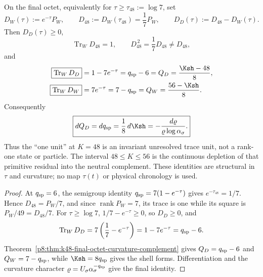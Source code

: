 \documentclass[12pt,a4paper]{article}
\begin{document}
\begin{corollary}
\label{p8:cor:final-octet-primitive-remnant-depletion}
On the final octet, equivalently for \(\tau\geq\tau_{48}:=\log7\), set
\begin{equation}
 \label{p8:eq:final-octet-remnant-operators}
 D_W(\tau):=e^{-\tau}P_W,
 \qquad
 D_{48}:=D_W(\tau_{48})=\frac17P_W,
 \qquad
 D_D(\tau):=D_{48}-D_W(\tau).
\end{equation}
Then \(D_D(\tau)\geq0\),
\begin{equation}
 \label{p8:eq:k48-unit-trace-nonprojector}
 \boxed{\operatorname{Tr}_W D_{48}=1},
 \qquad
 \boxed{D_{48}^{\,2}=\frac17D_{48}\neq D_{48}},
\end{equation}
and
\begin{align}
 \label{p8:eq:final-octet-remnant-trace-identities}
 \boxed{\operatorname{Tr}_W D_D}
 &=1-7e^{-\tau}
 =q_{\rm sp}-6
 =Q_D
 =\frac{\Ksh-48}{8},\\
 \boxed{\operatorname{Tr}_W D_W}
 &=7e^{-\tau}
 =7-q_{\rm sp}
 =Q_W
 =\frac{56-\Ksh}{8}.
\end{align}
Consequently
\begin{equation}
 \label{p8:eq:final-octet-transfer-exact-differential}
 \boxed{
 dQ_D=dq_{\rm sp}=\frac18\,d\Ksh
 =-\frac{d\varrho}{\varrho\log\alpha_\sigma}.}
\end{equation}
Thus the ``one unit'' at \(K=48\) is an invariant unresolved trace unit,
not a rank-one state or particle.  The interval \(48\leq K\leq56\) is the
continuous depletion of that primitive residual into the neutral complement.
These identities are structural in \(\tau\) and curvature; no map \(\tau(t)\)
or physical chronology is used.
\end{corollary}

\begin{proof}
At \(q_{\rm sp}=6\), the semigroup identity
\(q_{\rm sp}=7(1-e^{-\tau})\) gives \(e^{-\tau_{48}}=1/7\).  Hence
\(D_{48}=P_W/7\), and since \(\operatorname{rank}P_W=7\), its trace is one
while its square is \(P_W/49=D_{48}/7\).  For \(\tau\geq\log7\),
\(1/7-e^{-\tau}\geq0\), so \(D_D\geq0\), and
\[
 \operatorname{Tr}_W D_D
 =7\left(\frac17-e^{-\tau}\right)
 =1-7e^{-\tau}=q_{\rm sp}-6.
\]
Theorem~\ref{p8:thm:k48-final-octet-curvature-complement} gives
\(Q_D=q_{\rm sp}-6\) and \(Q_W=7-q_{\rm sp}\), while
\(\Ksh=8q_{\rm sp}\) gives the shell forms.  Differentiation and the
curvature character
\(\varrho=U_\sigma\alpha_\sigma^{-q_{\rm sp}}\) give the final identity.
\end{proof}
\end{document}
